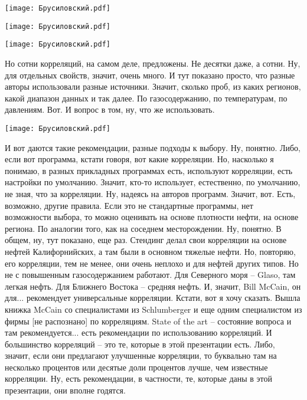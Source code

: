 \documentclass[main.tex]{subfiles}
\begin{document}
\begin{center}
\texttt{[image: Брусиловский.pdf]}
\end{center}



\begin{center}
\texttt{[image: Брусиловский.pdf]}
\end{center}



\begin{center}
\texttt{[image: Брусиловский.pdf]}
\end{center}

Но сотни корреляций, на самом деле, предложены.
Не десятки даже, а сотни.
Ну, для отдельных свойств, значит, очень много.
И тут показано просто, что разные авторы использовали разные источники.
Значит, сколько проб, из каких регионов, какой диапазон данных и так далее.
По газосодержанию, по температурам, по давлениям.
Вот.
И вопрос в том, ну, что же использовать.

\begin{center}
\texttt{[image: Брусиловский.pdf]}
\end{center}

И вот даются такие рекомендации, разные подходы к выбору.
Ну, понятно.
Либо, если вот программа, кстати говоря, вот какие корреляции.
Но, насколько я понимаю, в разных прикладных программах есть, используют корреляции, есть настройки по умолчанию.
Значит, кто-то использует, естественно, по умолчанию, не зная, что за корреляции.
Ну, надеясь на авторов программ.
Значит, вот.
Есть, возможно, другие правила.
Если это не стандартные программы, нет возможности выбора, то можно оценивать на основе плотности нефти, на основе региона.
По аналогии того, как на соседнем месторождении.
Ну, понятно.
В общем, ну, тут показано, еще раз.
Стендинг делал свои корреляции на основе нефтей Калифорнийских, а там были в основном тяжелые нефти.
Но, повторяю, его корреляции, тем не менее, они очень неплохо и для нефтей других типов.
Но не с повышенным газосодержанием работают.
Для Северного моря -- Glaso, там легкая нефть.
Для Ближнего Востока – средняя нефть.
И, значит, Bill McCain, он для... рекомендует универсальные корреляции.
Кстати, вот я хочу сказать.
Вышла книжка McCain со специалистами из Schlumberger и еще одним специалистом из фирмы [не распознано] по корреляциям.
State of the art -- состояние вопроса и там рекомендуется... есть рекомендации по использованию корреляций.
И большинство корреляций -- это те, которые в этой презентации есть.
Либо, значит, если они предлагают улучшенные корреляции, то буквально там на несколько процентов или десятые доли процентов лучше, чем известные корреляции.
Ну, есть рекомендации, в частности, те, которые даны в этой презентации, они вполне годятся.
\end{document}
